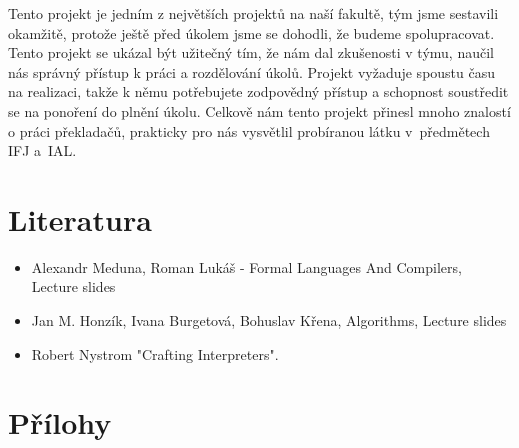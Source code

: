 \documentclass[a4paper, 11pt]{article}
\begin{document}
     Tento projekt je jedním z největších projektů na naší fakultě, tým jsme sestavili okamžitě, protože ještě před úkolem jsme se dohodli, že budeme spolupracovat. Tento projekt se ukázal být užitečný tím, že nám dal zkušenosti v týmu, naučil nás správný přístup k práci a rozdělování úkolů. Projekt vyžaduje spoustu času na realizaci, takže k němu potřebujete zodpovědný přístup a schopnost soustředit se na ponoření do plnění úkolu.
    Celkově nám tento projekt přinesl mnoho znalostí o práci překladačů, prakticky pro nás
    vysvětlil probíranou látku v~předmětech IFJ a~IAL.
    


    \section{Literatura}

    \begin{itemize}
        \item Alexandr Meduna, Roman Lukáš - Formal Languages And Compilers, Lecture slides
        \item Jan M. Honzík, Ivana Burgetová, Bohuslav Křena, Algorithms, Lecture slides
        \item Robert Nystrom "Crafting Interpreters". 
    \end{itemize}

 
	\clearpage
	
	\renewcommand{\refname}{Literatura}
	



        \section{Přílohy}
	\appendix
\end{document}
